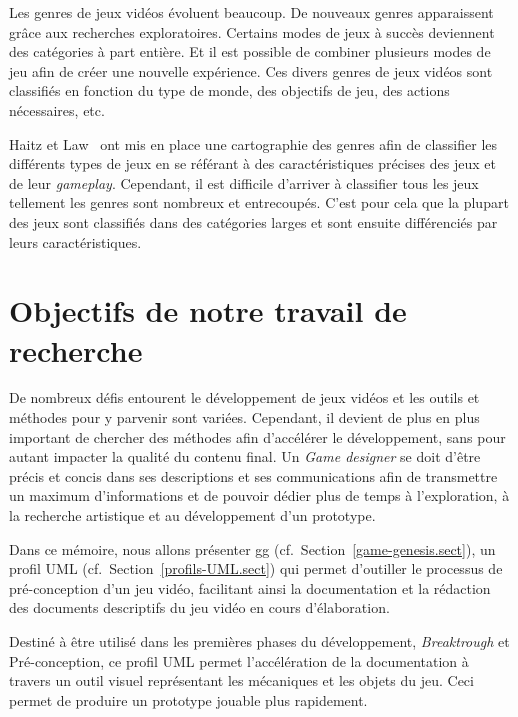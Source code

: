 Les genres de jeux vidéos évoluent beaucoup.
De nouveaux genres apparaissent grâce aux recherches exploratoires.
Certains modes de jeux à succès deviennent des catégories à part entière.
Et il est possible de combiner plusieurs modes de jeu afin de créer une nouvelle expérience.
Ces divers genres de jeux vidéos sont classifiés en fonction du type de monde, des objectifs de jeu, des actions nécessaires, etc. 

Haitz et Law~\cite{HeintzStephanie2015TGGM} ont mis en place une cartographie des genres afin de classifier les différents types de jeux en se référant à des caractéristiques précises des jeux et de leur \emph{gameplay}.
Cependant, il est difficile d'arriver à classifier tous les jeux tellement les genres sont nombreux et entrecoupés.
C'est pour cela que la plupart des jeux sont classifiés dans des catégories larges et sont ensuite différenciés par leurs caractéristiques.



\section{Objectifs de notre travail de recherche}


De nombreux défis entourent le développement de jeux vidéos et les outils et méthodes pour y parvenir sont variées.
Cependant, il devient de plus en plus important de chercher des méthodes afin d'accélérer le développement, sans pour autant impacter la qualité du contenu final.
Un \emph{Game designer} se doit d'être précis et concis dans ses descriptions et ses communications afin de transmettre un maximum d'informations et de pouvoir dédier plus de temps à l'exploration, à la recherche artistique et au développement d'un prototype. 



Dans ce mémoire, nous allons présenter \gls{gg} (cf.~Section~\ref{game-genesis.sect}), un profil UML (cf.~Section~\ref{profils-UML.sect}) qui permet d'outiller le processus de pré-conception d'un jeu vidéo, facilitant ainsi la documentation et la rédaction des documents descriptifs du jeu vidéo en cours d'élaboration.

Destiné à être utilisé dans les premières phases du développement, \emph{Breaktrough} et Pré-conception, ce profil UML permet l'accélération de la documentation à travers un outil visuel représentant les mécaniques et les objets du jeu.
Ceci permet de produire un prototype jouable plus rapidement.

